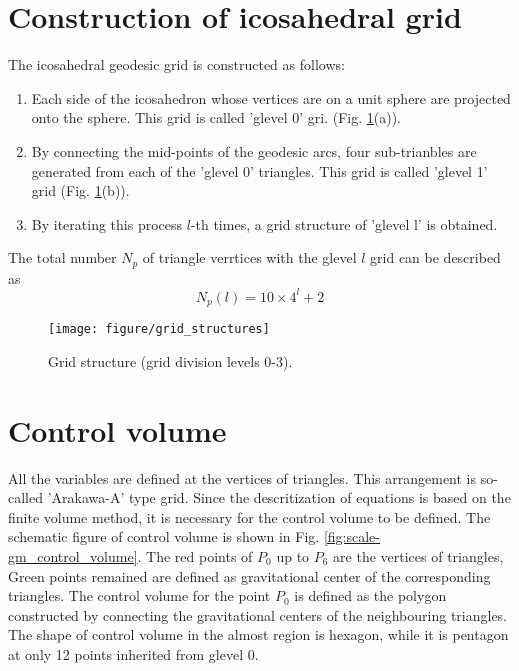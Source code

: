 \section{Construction of icosahedral grid}
The icosahedral geodesic grid is constructed as follows:
\begin{enumerate}
  \item Each side of the icosahedron whose vertices are on a unit sphere are
    projected onto the sphere. This grid is called 'glevel 0' gri. (Fig. \ref{fig:scale-gm_grid}(a)).
  \item By connecting the mid-points of the geodesic arcs, four
      sub-trianbles are generated from each of the 'glevel 0' triangles. This
      grid is called 'glevel 1' grid (Fig. \ref{fig:scale-gm_grid}(b)).
  \item By iterating this process $l$-th times, a grid structure of 'glevel l'
    is obtained. 
\end{enumerate}
The total number $N_p$ of triangle verrtices with the glevel $l$ grid can be
described as 
\begin{equation}
  N_p(l) = 10 \times 4^l + 2 \nonumber
\end{equation}

\begin{figure}[H]
  \begin{center}
    \texttt{[image: figure/grid\_structures]}
    \caption{Grid structure (grid division levels 0-3).}
    \label{fig:scale-gm_grid}
  \end{center}
\end{figure}


\section{Control volume}
All the  variables are defined at the vertices of triangles. This arrangement
is so-called 'Arakawa-A' type grid. Since the descritization of equations is
based on the finite volume method, it is necessary for the control volume to
be defined. The schematic figure of control volume is shown in Fig. \ref{fig:scale-gm_control_volume}. The
red points of $P_0$ up to $P_6$ are the vertices of triangles, Green points
remained are defined as gravitational center of the corresponding
triangles. The control volume for the point $P_0$ is defined as the polygon
constructed by connecting the gravitational centers of the neighbouring
triangles. The shape of control volume in the almost region is hexagon, while
it is pentagon at only 12 points inherited from glevel 0.

